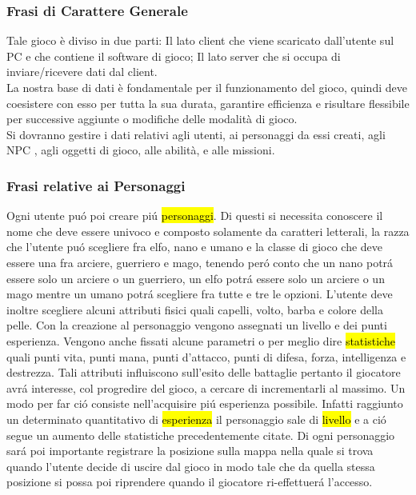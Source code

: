 
\subsubsection{Frasi di Carattere Generale}
Tale gioco è diviso in due parti: 
Il lato client che viene scaricato dall'utente sul PC e  che contiene il software di gioco; 
Il lato server  che si occupa di inviare/ricevere dati dal client. 
\\
La nostra base di dati è fondamentale per il funzionamento del gioco, quindi deve coesistere con esso per tutta la sua durata, garantire efficienza e risultare flessibile per successive aggiunte o modifiche delle modalità di gioco.
\\
Si dovranno gestire i dati relativi agli utenti, ai personaggi da essi creati, agli NPC , agli oggetti di gioco, alle abilità, e alle missioni.\\

\subsubsection{Frasi relative ai Personaggi}

Ogni utente pu\'{o} poi creare pi\'{u} \hl{personaggi}. Di questi si necessita conoscere il nome che deve essere univoco e composto solamente da caratteri letterali, la razza che l'utente pu\'{o} scegliere fra elfo, nano e umano e la classe di gioco che deve essere una fra arciere, guerriero e mago, tenendo per\'{o} conto  che un nano potr\'{a} essere solo un arciere o un guerriero, un elfo potr\'{a} essere solo un arciere o un mago mentre un umano potr\'{a} scegliere fra  tutte e tre le opzioni. L'utente deve inoltre scegliere alcuni attributi fisici quali capelli, volto, barba e colore della pelle. Con la creazione al personaggio vengono assegnati un livello e dei punti esperienza. Vengono anche  fissati  alcune parametri o per meglio dire  \hl{statistiche} quali punti vita, punti mana, punti d'attacco, punti di difesa, forza, intelligenza e destrezza. Tali attributi influiscono sull'esito delle battaglie pertanto il giocatore avr\'{a} interesse, col progredire del gioco, a cercare di incrementarli al massimo. Un modo per far ci\'{o} consiste nell'acquisire pi\'{u} esperienza possibile. Infatti raggiunto un determinato quantitativo di \hl{esperienza} il personaggio sale di \hl{livello} e a ci\'{o} segue un aumento delle statistiche precedentemente citate. 
Di ogni personaggio sar\'{a} poi importante registrare la posizione sulla mappa nella quale si trova quando l'utente decide di uscire dal gioco in modo tale che da quella stessa posizione si possa poi riprendere quando il giocatore ri-effettuer\'{a} l'accesso.

